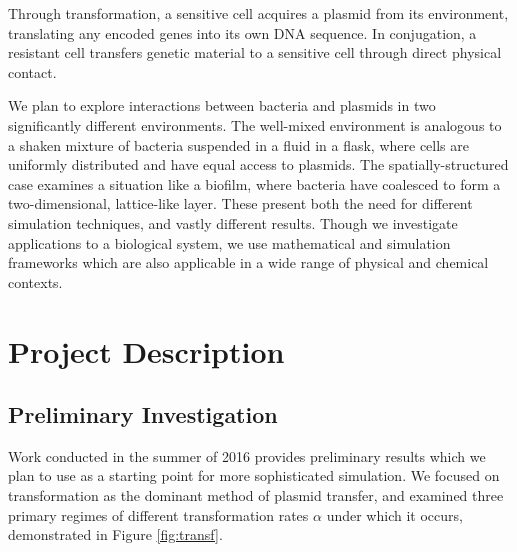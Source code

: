 \documentclass[numbib]{buthesis_p}  %
\begin{document}
Through transformation, a sensitive cell acquires a plasmid from its environment,
translating any encoded genes into its own DNA sequence. In conjugation,
a resistant cell transfers genetic material to a sensitive cell through direct
physical contact. %


We plan to explore interactions between bacteria and plasmids in two
significantly different environments. %
The well-mixed environment is analogous
to a shaken mixture of bacteria suspended in a fluid in a flask, where cells are
uniformly distributed and have equal access to plasmids. The spatially-structured
case examines a situation like a biofilm, where bacteria have coalesced to form
a two-dimensional, lattice-like layer. %
These present both the need for different simulation techniques, and vastly
different results. Though we investigate applications to a biological system,
we use mathematical and simulation frameworks which are also applicable in a wide range
of physical and chemical contexts.

\section{Project Description}



\subsection{Preliminary Investigation}
Work conducted in the summer of 2016 provides preliminary results which we plan
to use as a starting point for more sophisticated simulation. We focused on
transformation as the dominant method of plasmid transfer, and examined three
primary regimes of different transformation rates $\alpha$ under which it occurs,
demonstrated in Figure \ref{fig:transf}. %
\end{document}
